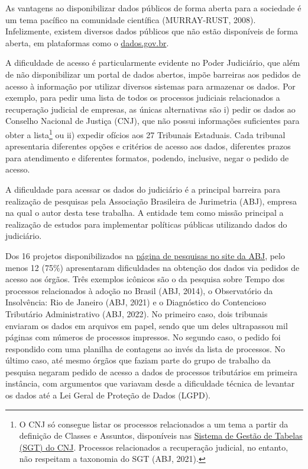 \documentclass[12pt,twoside,brazilian]{book}
\begin{document}
As vantagens ao disponibilizar dados públicos de forma aberta para a
sociedade é um tema pacífico na comunidade científica (MURRAY-RUST,
2008). Infelizmente, existem diversos dados públicos que não estão
disponíveis de forma aberta, em plataformas como o
\href{https://dados.gov.br}{dados.gov.br}.

A dificuldade de acesso é particularmente evidente no Poder Judiciário,
que além de não disponibilizar um portal de dados abertos, impõe
barreiras aos pedidos de acesso à informação por utilizar diversos
sistemas para armazenar os dados. Por exemplo, para pedir uma lista de
todos os processos judiciais relacionados a recuperação judicial de
empresas, as únicas alternativas são i) pedir os dados ao Conselho
Nacional de Justiça (CNJ), que não possui informações suficientes para
obter a lista\footnote{O CNJ só consegue listar os processos
  relacionados a um tema a partir da definição de Classes e Assuntos,
  disponíveis nas
  \href{https://www.cnj.jus.br/sgt/consulta_publica_classes.php}{Sistema
  de Gestão de Tabelas (SGT) do CNJ}. Processos relacionados a
  recuperação judicial, no entanto, não respeitam a taxonomia do SGT
  (ABJ, 2021).} ou ii) expedir ofícios aos 27 Tribunais Estaduais. Cada
tribunal apresentaria diferentes opções e critérios de acesso aos dados,
diferentes prazos para atendimento e diferentes formatos, podendo,
inclusive, negar o pedido de acesso.

A dificuldade para acessar os dados do judiciário é a principal barreira
para realização de pesquisas pela Associação Brasileira de Jurimetria
(ABJ), empresa na qual o autor desta tese trabalha. A entidade tem como
missão principal a realização de estudos para implementar políticas
públicas utilizando dados do judiciário.

Dos 16 projetos disponibilizados na
\href{https://abj.org.br/pesquisas/}{página de pesquisas no site da
ABJ}, pelo menos 12 (75\%) apresentaram dificuldades na obtenção dos
dados via pedidos de acesso aos órgãos. Três exemplos icônicos são o da
pesquisa sobre Tempo dos processos relacionados à adoção no Brasil (ABJ,
2014), o Observatório da Insolvência: Rio de Janeiro (ABJ, 2021) e o
Diagnóstico do Contencioso Tributário Administrativo (ABJ, 2022). No
primeiro caso, dois tribunais enviaram os dados em arquivos em papel,
sendo que um deles ultrapassou mil páginas com números de processos
impressos. No segundo caso, o pedido foi respondido com uma planilha de
contagens ao invés da lista de processos. No último caso, até mesmo
órgãos que faziam parte do grupo de trabalho da pesquisa negaram pedido
de acesso a dados de processos tributários em primeira instância, com
argumentos que variavam desde a dificuldade técnica de levantar os dados
até a Lei Geral de Proteção de Dados (LGPD).
\end{document}
